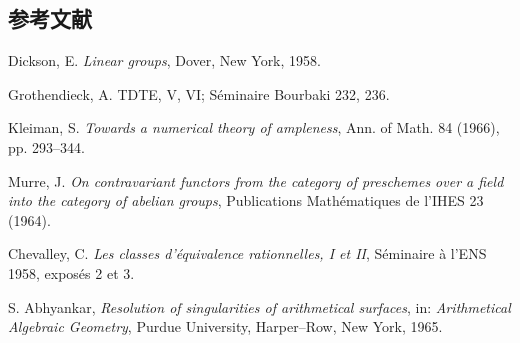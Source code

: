 \subsection*{参考文献}
\begin{enumerate}[label={[\arabic*]}]
\item Dickson, E. \emph{Linear groups}, Dover, New York, 1958.
\item Grothendieck, A. TDTE, V, VI; S\'eminaire Bourbaki 232, 236.
\item Kleiman, S. \emph{Towards a numerical theory of ampleness}, Ann. of
  Math. 84 (1966), pp. 293--344.
\item Murre, J. \emph{On contravariant functors from the category of
  preschemes over a field into the category of abelian groups}, Publications
  Math\'ematiques de l'IHES 23 (1964).
\item Chevalley, C. \emph{Les classes d'\'equivalence rationnelles, I et II},
  S\'eminaire \`a l'ENS 1958, expos\'es 2 et 3.
\item S. Abhyankar, \emph{Resolution of singularities of arithmetical
  surfaces}, in: \emph{Arithmetical Algebraic Geometry}, Purdue University,
  Harper--Row, New York, 1965.
\end{enumerate}

